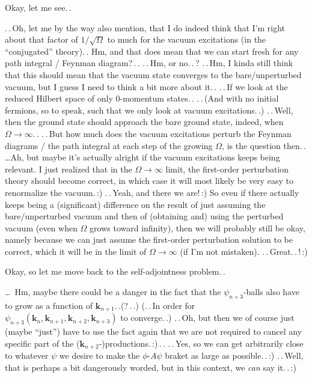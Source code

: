 \documentclass{report}
\begin{document}
Okay, let me see.\,. 

.\,.\,Oh, let me by the way also mention, that I do indeed think that I'm right about that factor of $1/\sqrt{\Omega}$ to much for the vacuum excitations (in the ``conjugated'' theory).\,. Hm, and that does mean that we can start fresh for any path integral / Feynman diagram?\,.\,. .\,.\,Hm, or no.\,.\,? .\,.\,Hm, I kinda still think that this should mean that the vacuum state converges to the bare/unperturbed vacuum, but I guess I need to think a bit more about it.\,. .\,.\,If we look at the reduced Hilbert space of only 0-momentum states.\,. .\,.\,(And with no initial fermions, so to speak, such that we only look at vacuum excitations.\,.) .\,.\,Well, then the ground state should approach the bare ground state, indeed, when $\Omega\to\infty$.\,. .\,.\,But how much does the vacuum excitations perturb the Feynman diagrams / the path integral at each step of the growing $\Omega$, is the question then.\,. %
\ldots Ah, but maybe it's actually alright if the vacuum excitations keeps being relevant. I just realized that in the $\Omega\to\infty$ limit, the first-order perturbation theory should become correct, in which case it will most likely be very easy to renormalize the vacuum.\,:) .\,.\,Yeah, and there we are!\,:) So even if there actually keeps being a (significant) difference on the result of just assuming the bare/unperturbed vacuum and then of (obtaining and) using the perturbed vacuum (even when $\Omega$ grows toward infinity), then we will probably still be okay, namely because we can just assume the first-order perturbation solution to be correct, which it will be in the limit of $\Omega\to\infty$ (if I'm not mistaken). .\,.\,Great.\,.\,!\,:) 

Okay, so let me move back to the self-adjointness problem.\,. 

\ldots\ Hm, maybe there could be a danger in the fact that the $\psi_{n+3}$-balls also have to grow as a function of $\mathbf{k}_{n+1}$.\,.(?\,.\,.) (.\,.\,In order for $\psi_{n+3}(\mathbf{k}_{n}, \mathbf{k}_{n+1}, \mathbf{k}_{n+2}, \mathbf{k}_{n+3})$ to converge.\,.) .\,.\,Oh, but then we of course just (maybe ``just'') have to use the fact again that we are not required to cancel any specific part of the ($\mathbf{k}_{n+2}$-)productions.\,:)\,.\,. %
.\,.\,Yes, so we can get arbitrarily close to whatever $\psi$ we desire to make the $\phi$-$A \psi$ braket as large as possible.\,.\,:) 
.\,.\,Well, that is perhaps a bit dangerously worded, but in this context, we \emph{can} say it.\,.\,:) 
\end{document}

